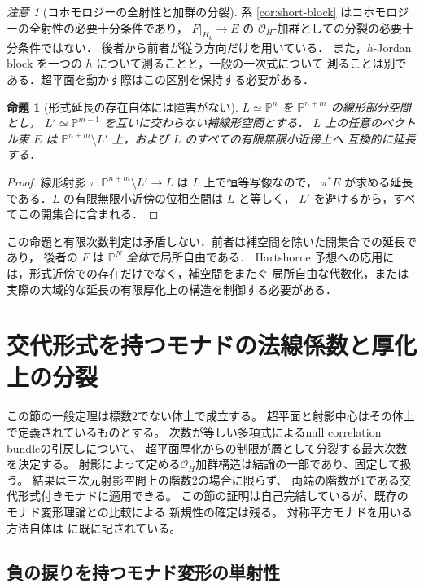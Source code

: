 \documentclass[a4paper,11pt]{ltjsarticle}
\numberwithin{equation}{section}
\theoremstyle{plain}
\newtheorem{proposition}[theorem]{命題}
\theoremstyle{definition}
\theoremstyle{remark}
\newtheorem{remark}[theorem]{注意}
\begin{document}
\begin{remark}[コホモロジーの全射性と加群の分裂]
系 \ref{cor:short-block} はコホモロジーの全射性の必要十分条件であり，
$F|_{H_k}\to E$ の $\mathcal O_H$-加群としての分裂の必要十分条件ではない．
後者から前者が従う方向だけを用いている．
また，$h$-Jordan block を一つの $h$ について測ることと，一般の一次式について
測ることは別である．超平面を動かす際はこの区別を保持する必要がある．
\end{remark}

\begin{proposition}[形式延長の存在自体には障害がない]\label{prop:tautological-extension}
$L\simeq\mathbb P^n$ を $\mathbb P^{n+m}$ の線形部分空間とし，
$L'\simeq\mathbb P^{m-1}$ を互いに交わらない補線形空間とする．
$L$ 上の任意のベクトル束 $E$ は
$\mathbb P^{n+m}\setminus L'$ 上，および $L$ のすべての有限無限小近傍上へ
互換的に延長する．
\end{proposition}

\begin{proof}
線形射影 $\pi:\mathbb P^{n+m}\setminus L'\to L$ は $L$ 上で恒等写像なので，
$\pi^*E$ が求める延長である．$L$ の有限無限小近傍の位相空間は $L$ と等しく，
$L'$ を避けるから，すべてこの開集合に含まれる．
\end{proof}

この命題と有限次数判定は矛盾しない．前者は補空間を除いた開集合での延長であり，
後者の $F$ は $\mathbb P^N$ \emph{全体}で局所自由である．
Hartshorne 予想への応用には，形式近傍での存在だけでなく，補空間をまたぐ
局所自由な代数化，または実際の大域的な延長の有限厚化上の構造を制御する必要がある．

\section{交代形式を持つモナドの法線係数と厚化上の分裂}
\label{sec:normal-coefficient}

この節の一般定理は標数$2$でない体上で成立する。
超平面と射影中心はその体上で定義されているものとする。
次数が等しい多項式によるnull correlation bundleの引戻しについて、
超平面厚化からの制限が層として分裂する最大次数を決定する。
射影によって定める$\mathcal O_H$加群構造は結論の一部であり、固定して扱う。
結果は三次元射影空間上の階数$2$の場合に限らず、
両端の階数が$1$である交代形式付きモナドに適用できる。
この節の証明は自己完結しているが、既存のモナド変形理論との比較による
新規性の確定は残る。
対称平方モナドを用いる方法自体は
\cite[p.~8]{TikhomirovTikhomirovVasiliev2018}に既に記されている。

\subsection{負の捩りを持つモナド変形の単射性}
\end{document}
